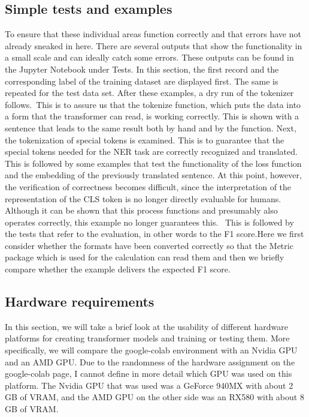 \subsection{Simple tests and examples}
To ensure that these individual areas function correctly and that errors have not already sneaked in here. There are several outputs that show the functionality in a small scale and can ideally catch some errors. These outputs can be found in the Jupyter Notebook under Tests. In this section, the first record and the corresponding label of the training dataset are displayed first. The same is repeated for the test data set. After these examples, a dry run of the tokenizer follows. This is to assure us that the tokenize function, which puts the data into a form that the transformer can read, is working correctly. This is shown with a sentence that leads to the same result both by hand and by the function.  Next, the tokenization of special tokens is examined. This is to guarantee that the special tokens needed for the NER task are correctly recognized and translated. This is followed by some examples that test the functionality of the loss function and the embedding of the previously translated sentence. At this point, however, the verification of correctness becomes difficult, since the interpretation of the representation of the CLS token is no longer directly evaluable for humans. Although it can be shown that this process functions and presumably also operates correctly, this example no longer guarantees this.  This is followed by the tests that refer to the evaluation, in other words to the F1 score.Here we first consider whether the formats have been converted correctly so that the Metric package which is used for the calculation can read them and then we briefly compare whether the example delivers the expected F1 score. 

\subsection{Hardware requirements}
In this section, we will take a brief look at the usability of different hardware platforms for creating transformer models and training or testing them. More specifically, we will compare the google-colab environment with an Nvidia GPU and an AMD GPU. Due to the randomness of the hardware assignment on the google-colab page, I cannot define in more detail which GPU was used on this platform. The Nvidia GPU that was used was a GeForce 940MX with about 2 GB of VRAM, and the AMD GPU on the other side was an RX580 with about 8 GB of VRAM. 


